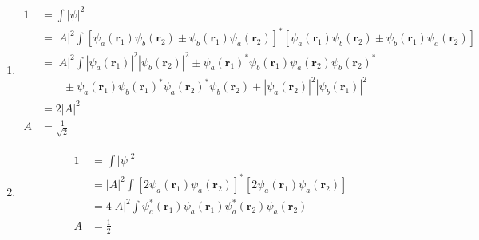 \documentclass{article}
\renewcommand{\vec}[1]{\boldsymbol{\mathbf{#1}}}
\begin{document}
\begin{enumerate}
  \item

        \begin{align*}
          1 & = \int |\psi|^2                                                                                                                                                            \\
            & = |A|^2 \int [\psi_a(\vec{r}_1) \psi_b(\vec{r}_2) \pm \psi_b(\vec{r}_1) \psi_a(\vec{r}_2)]^* [\psi_a(\vec{r}_1) \psi_b(\vec{r}_2) \pm \psi_b(\vec{r}_1) \psi_a(\vec{r}_2)] \\
            & = |A|^2 \int |\psi_a(\vec{r}_1)|^2 |\psi_b(\vec{r}_2)|^2 \pm \psi_a(\vec{r}_1)^* \psi_b(\vec{r}_1) \psi_a(\vec{r}_2) \psi_b(\vec{r}_2)^*                                   \\
            & \qquad \pm \psi_a(\vec{r}_1) \psi_b(\vec{r}_1)^* \psi_a(\vec{r}_2)^* \psi_b(\vec{r}_2) + |\psi_a(\vec{r}_2)|^2 |\psi_b(\vec{r}_1)|^2                                       \\
            & = 2 |A|^2                                                                                                                                                                  \\
          A & = \frac{1}{\sqrt{2}}
        \end{align*}

  \item

        \begin{align*}
          1 & = \int |\psi|^2                                                                                \\
            & = |A|^2 \int [2 \psi_a(\vec{r}_1) \psi_a(\vec{r}_2)]^* [2 \psi_a(\vec{r}_1) \psi_a(\vec{r}_2)] \\
            & = 4 |A|^2 \int \psi_a^*(\vec{r}_1) \psi_a(\vec{r}_1) \psi_a^*(\vec{r}_2) \psi_a(\vec{r}_2)     \\
          A & = \frac{1}{2}
        \end{align*}
\end{enumerate}

\subsection{}
\end{document}
